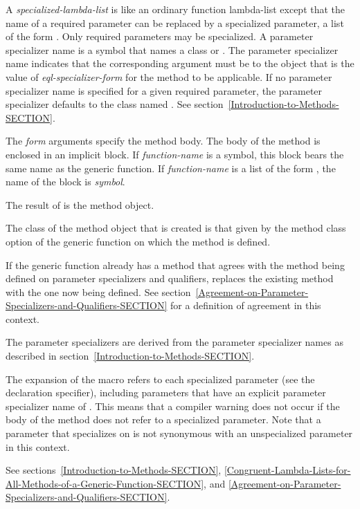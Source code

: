 \begin{defmac}
A \emph{specialized-lambda-list} is like an ordinary
function lambda-list except that the name of a required parameter can
be replaced by a specialized parameter, a
list of the form .  Only required parameters may be
specialized.  A parameter specializer name is a symbol that names a
class or .  The parameter
specializer name  indicates
that the corresponding argument must be  to the object that
is the value of \emph{eql-specializer-form} for the method to be
applicable.  If no parameter specializer name is specified for a given
required parameter, the parameter specializer defaults to the class
named .  See section~\ref{Introduction-to-Methods-SECTION}.

The \emph{form} arguments specify the method body.
The body of the method is enclosed in an implicit block.  If
\emph{function-name} is a symbol, this block bears the same name as the
generic function.  If \emph{function-name} is a list of the form 
, the name of the block is \emph{symbol}.

The result of  is the method object.

The class of the method object that is created is that given by the 
method class option of the generic function on which the method is defined.

If the generic function already has a method that agrees with the
method being defined on parameter specializers and qualifiers, 
 replaces the existing method with the one now being
defined.  See
section~\ref{Agreement-on-Parameter-Specializers-and-Qualifiers-SECTION}
for a definition of agreement in this context.

The parameter specializers are derived from the parameter specializer
names as described in section~\ref{Introduction-to-Methods-SECTION}.

The expansion of the  macro refers to each
specialized parameter (see the  declaration specifier), including
parameters that
have an explicit parameter specializer name of .  This means
that a compiler warning does not occur if the body of the method does
not refer to a specialized parameter.  Note that a parameter that
specializes on  is not synonymous with an unspecialized
parameter in this context.

See sections~\ref{Introduction-to-Methods-SECTION},
\ref{Congruent-Lambda-Lists-for-All-Methods-of-a-Generic-Function-SECTION},
and \ref{Agreement-on-Parameter-Specializers-and-Qualifiers-SECTION}.
\end{defmac}


